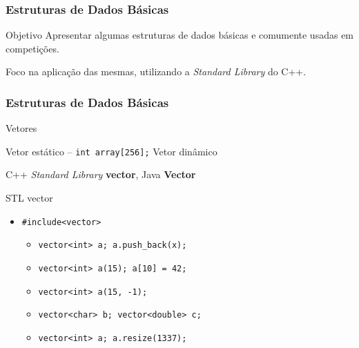 


\begin{frame}
\frametitle{Estruturas de Dados Básicas}
\begin{block}{Objetivo}
Apresentar algumas estruturas de dados básicas e comumente usadas em competições.
\begin{itemize}
	\bitem Foco na aplicação das mesmas, utilizando a \emph{Standard Library} do C++.
\end{itemize}
\end{block}
\end{frame}

\begin{frame}
\frametitle{Estruturas de Dados Básicas}
\begin{block}{Vetores}
\begin{itemize}
	\bitem Vetor estático -- \texttt{int array[256];}
	\bitem Vetor dinâmico 
	\begin{itemize}
		\bitem C++ \emph{Standard Library} \textbf{vector}, Java \textbf{Vector}
	\end{itemize}
\end{itemize}
\end{block}

\begin{block}{STL vector}
\begin{itemize}
	\item[] \texttt{\#include<vector>}
	\begin{itemize}
		\item[] \texttt{vector<int> a;    a.push\_back(x); }
		\item[] \texttt{vector<int> a(15);  a[10] = 42;}
		\item[] \texttt{vector<int> a(15, -1);}
		\item[] \texttt{vector<char> b; vector<double> c;}
		\item[] \texttt{vector<int> a; a.resize(1337); }
	\end{itemize}
\end{itemize}
\end{block}
\end{frame}

